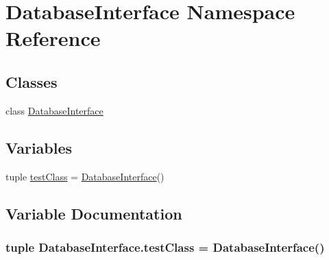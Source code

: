\hypertarget{namespace_database_interface}{\section{Database\-Interface Namespace Reference}
\label{namespace_database_interface}
}
\subsection*{Classes}
\begin{DoxyCompactItemize}
\item 
class \hyperlink{class_database_interface_1_1_database_interface}{Database\-Interface}
\end{DoxyCompactItemize}
\subsection*{Variables}
\begin{DoxyCompactItemize}
\item 
tuple \hyperlink{namespace_database_interface_aa4d1de1291859c0a652dc7dc753bcd6f}{test\-Class} = \hyperlink{class_database_interface_1_1_database_interface}{Database\-Interface}()
\end{DoxyCompactItemize}


\subsection{Variable Documentation}
\hypertarget{namespace_database_interface_aa4d1de1291859c0a652dc7dc753bcd6f}{
\subsubsection[{test\-Class}]{\setlength{\rightskip}{0pt plus 5cm}tuple {\bf Database\-Interface.\-test\-Class} = {\bf Database\-Interface}()}}\label{namespace_database_interface_aa4d1de1291859c0a652dc7dc753bcd6f}
